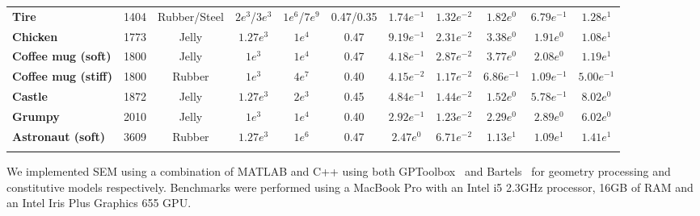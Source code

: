 \begin{table}[h]
\begin{center}
\begin{tabular}{l c c c c c c c c c c}
   \rowcolor[HTML]{DAE8FC} 
   \textbf{Tire}                    & 1404 & Rubber/Steel & $2 e^3$/$3 e^3$ & $1 e^6$/$7 e^9$ & 0.47/0.35 & $1.74 e^{-1}$ & $1.32 e^{-2}$ & $1.82 e^{0}$ & $6.79 e^{-1}$ & $1.28 e^{1}$ \\
   \textbf{Chicken}                 & 1773 & Jelly & $1.27 e^3$ & $1 e^4$ & 0.47 & $9.19 e^{-1}$ & $2.31 e^{-2}$ & $3.38 e^{0}$ & $1.91 e^{0}$ & $1.08 e^{1}$ \\
   \rowcolor[HTML]{DAE8FC} 
   \textbf{Coffee mug (soft)}       & 1800 & Jelly & $1 e^3$ & $1 e^4$ & 0.47 & $4.18 e^{-1}$ & $2.87 e^{-2}$ & $3.77 e^{0}$ & $2.08 e^{0}$ & $1.19 e^{1}$  \\ 
   \textbf{Coffee mug (stiff)}      & 1800 & Rubber & $1 e^3$ & $4 e^7$ & 0.40 & $4.15 e^{-2}$ & $1.17 e^{-2}$ & $6.86 e^{-1}$ & $1.09 e^{-1}$ & $5.00 e^{-1}$  \\ 
   \rowcolor[HTML]{DAE8FC} 
   \textbf{Castle}                  & 1872 & Jelly & $1.27 e^3$ & $2 e^3$ & 0.45 & $4.84 e^{-1}$ & $1.44 e^{-2}$ & $1.52 e^{0}$ & $5.78 e^{-1}$ & $8.02 e^{0}$ \\
   \textbf{Grumpy}                  & 2010 & Jelly & $1 e^3$ & $1 e^4$ & 0.40 & $2.92 e^{-1}$ & $1.23 e^{-2}$ & $2.29 e^{0}$ & $2.89 e^{0}$ & $6.02 e^{0}$  \\    
   \rowcolor[HTML]{DAE8FC} 
   \textbf{Astronaut (soft)}        & 3609 & Rubber &  $1.27 e^3$  & $1 e^6$  & 0.47 & $2.47 e^{0}$ & $6.71 e^{-2}$ & $1.13 e^{1}$ & $1.09 e^{1}$ & $1.41 e^{1}$ \\
   \rowcolor[HTML]{DAE8FC} 
   \hline
  \end{tabular}
  \end{center}
  
  \end{table}




We implemented SEM using a combination of MATLAB and C++ using both GPToolbox~\cite{gptoolbox} and Bartels~\cite{bartels} for geometry processing and constitutive models 
respectively. Benchmarks were performed using a MacBook Pro with an Intel i5 2.3GHz processor, 16GB of RAM and an Intel Iris Plus Graphics 655 GPU.


